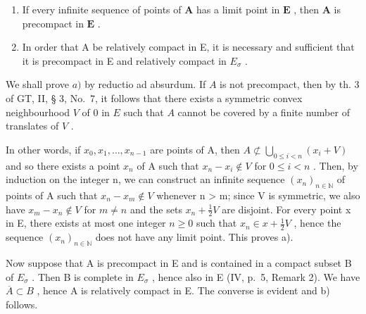 \begin{enumerate}
\def\labelenumi{\alph{enumi})}
\item
  If every infinite sequence of points of \(\mathbf{A}\) has a limit point in \(\mathbf{E}\) , then \(\mathbf{A}\) is precompact in \(\mathbf{E}\) .
\item
  In order that A be relatively compact in E, it is necessary and sufficient that it is precompact in E and relatively compact in \(E_{\sigma}\) .
\end{enumerate}

We shall prove \(a)\) by reductio ad absurdum. If \(A\) is not precompact, then by th. 3 of GT, II, § 3, No.~7, it follows that there exists a symmetric convex neighbourhood \(V\) of 0 in \(E\) such that \(A\) cannot be covered by a finite number of translates of \(V\) .

In other words, if \(x_{0}, x_{1}, \ldots, x_{n-1}\) are points of A, then \(A \not\subset \bigcup_{0 \leqslant i < n} (x_{i} + V)\) and so there exists a point \(x_{n}\) of A such that \(x_{n} - x_{i} \notin V\) for \(0 \leqslant i < n\) . Then, by induction on the integer n, we can construct an infinite sequence \((x_{n})_{n \in \mathbb{N}}\) of points of A such that \(x_{n} - x_{m} \notin V\) whenever n \textgreater{} m; since V is symmetric, we also have \(x_{m} - x_{n} \notin V\) for \(m \neq n\) and the sets \(x_{n} + \frac{1}{2}V\) are disjoint. For every point x in E, there exists at most one integer \(n \geqslant 0\) such that \(x_{n} \in x + \frac{1}{2}V\) , hence the sequence \((x_{n})_{n \in \mathbb{N}}\) does not have any limit point. This proves a).

Now suppose that A is precompact in E and is contained in a compact subset B of \(E_{\sigma}\) . Then B is complete in \(E_{\sigma}\) , hence also in E (IV, p.~5, Remark 2). We have \(\overline{A} \subset B\) , hence A is relatively compact in E. The converse is evident and b) follows.

